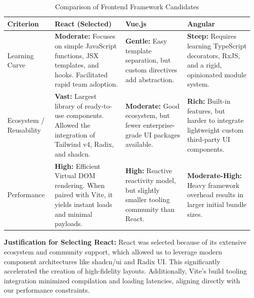 \documentclass[letterpaper%
, oneside%
, 12pt%
, memoireprojet%
, english%
,creativecommons,hyperref, withAlgo2e %
]{thETS}
\begin{document}
\begin{table}[H]
\centering
\begin{tabular}{|p{2.5cm}|p{4.2cm}|p{4.2cm}|p{4.2cm}|}
\hline
\textbf{Criterion} & \textbf{React (Selected)} & \textbf{Vue.js} & \textbf{Angular} \\ \hline
Learning Curve & \textbf{Moderate:} Focuses on simple JavaScript functions, JSX templates, and hooks. Facilitated rapid team adoption. & \textbf{Gentle:} Easy template separation, but custom directives add abstraction. & \textbf{Steep:} Requires learning TypeScript decorators, RxJS, and a rigid, opinionated module system. \\ \hline
Ecosystem / Reusability & \textbf{Vast:} Largest library of ready-to-use components. Allowed the integration of Tailwind v4, Radix, and shadcn. & \textbf{Moderate:} Good ecosystem, but fewer enterprise-grade UI packages available. & \textbf{Rich:} Built-in features, but harder to integrate lightweight custom third-party UI components. \\ \hline
Performance & \textbf{High:} Efficient Virtual DOM rendering. When paired with Vite, it yields instant loads and minimal payloads. & \textbf{High:} Reactive reactivity model, but slightly smaller tooling community than React. & \textbf{Moderate-High:} Heavy framework overhead results in larger initial bundle sizes. \\ \hline
\end{tabular}
\caption{Comparison of Frontend Framework Candidates}
\label{tab:frontend_comparison}
\end{table}

\textbf{Justification for Selecting React:} React was selected because of its extensive ecosystem and community support, which allowed us to leverage modern component architectures like shadcn/ui and Radix UI. This significantly accelerated the creation of high-fidelity layouts. Additionally, Vite's build tooling integration minimized compilation and loading latencies, aligning directly with our performance constraints.
\end{document}
